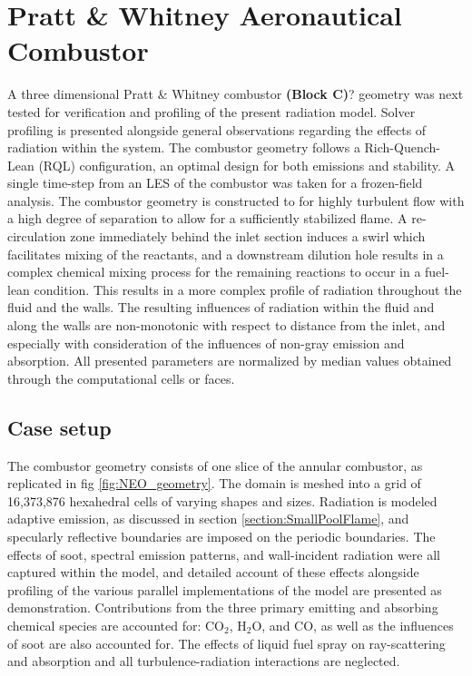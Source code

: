 \section{Pratt \& Whitney Aeronautical Combustor}
A three dimensional Pratt \& Whitney combustor \textbf{(Block C)}? geometry was next tested for verification and profiling of the present radiation model. Solver profiling is presented alongside general observations regarding the effects of radiation within the system.
The combustor geometry follows a Rich-Quench-Lean (RQL) configuration, an optimal design for both emissions and stability.
A single time-step from an LES of the combustor was taken for a frozen-field analysis. 
The combustor geometry is constructed to for highly turbulent flow with a high degree of separation to allow for a sufficiently stabilized flame.
A re-circulation zone immediately behind the inlet section induces a swirl which facilitates mixing of the reactants, and a downstream dilution hole results in a complex chemical mixing process for the remaining reactions to occur in a fuel-lean condition. This results in a more complex profile of radiation throughout the fluid and the walls.
The resulting influences of radiation within the fluid and along the walls are non-monotonic with respect to distance from the inlet, and especially with consideration of the influences of non-gray emission and absorption. 
All presented parameters are normalized by median values obtained through the computational cells or faces.


\subsection{Case setup}
The combustor geometry consists of one slice of the annular combustor, as replicated in fig \ref{fig:NEO_geometry}. The domain is meshed into a grid of 16,373,876 hexahedral cells of varying shapes and sizes. Radiation is modeled adaptive emission, as discussed in section \ref{section:SmallPoolFlame}, and specularly reflective boundaries are imposed on the periodic boundaries.
The effects of soot, spectral emission patterns, and wall-incident radiation were all captured within the model, and detailed account of these effects alongside profiling of the various parallel implementations of the model are presented as demonstration.
Contributions from the three primary emitting and absorbing chemical species are accounted for: CO$_2$, H$_2$O, and CO, as well as the influences of soot are also accounted for.
The effects of liquid fuel spray on ray-scattering and absorption and all turbulence-radiation interactions are neglected.

